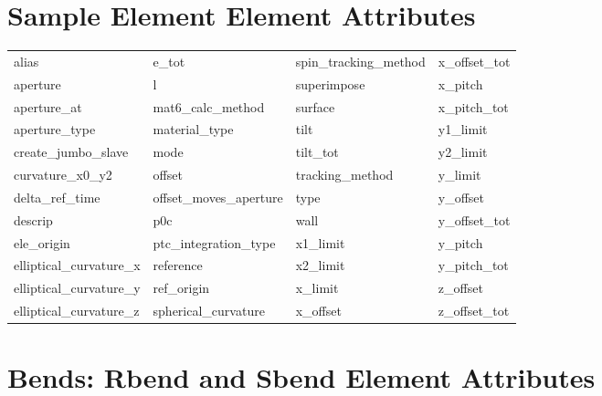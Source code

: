  \section{Sample Element Element Attributes}
 \label{s:list.sample}
 
 \begin{tabular}{llll} \toprule
alias                       & e_tot                       & spin_tracking_method        & x_offset_tot                \\
aperture                    & l                           & superimpose                 & x_pitch                     \\
aperture_at                 & mat6_calc_method            & surface                     & x_pitch_tot                 \\
aperture_type               & material_type               & tilt                        & y1_limit                    \\
create_jumbo_slave          & mode                        & tilt_tot                    & y2_limit                    \\
curvature_x0_y2             & offset                      & tracking_method             & y_limit                     \\
delta_ref_time              & offset_moves_aperture       & type                        & y_offset                    \\
descrip                     & p0c                         & wall                        & y_offset_tot                \\
ele_origin                  & ptc_integration_type        & x1_limit                    & y_pitch                     \\
elliptical_curvature_x      & reference                   & x2_limit                    & y_pitch_tot                 \\
elliptical_curvature_y      & ref_origin                  & x_limit                     & z_offset                    \\
elliptical_curvature_z      & spherical_curvature         & x_offset                    & z_offset_tot                \\
 \bottomrule
 \end{tabular}
 \vfill
 
 \section{Bends: Rbend and Sbend Element Attributes}
 \label{s:list.bend}
 
